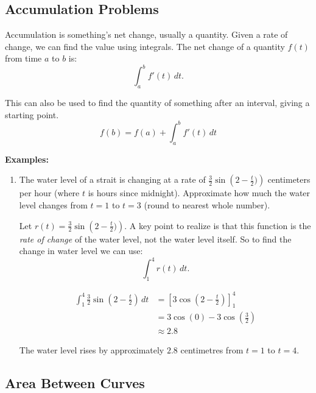 \documentclass[12pt]{article}
\begin{document}
\subsection{Accumulation Problems}
Accumulation is something's net change, usually a quantity. Given a rate of change, we can find the value using integrals. The net change of a quantity $f(t)$ from time $a$ to $b$ is:
\[ \int_{a}^{b} f'(t) \, dt. \]

This can also be used to find the quantity of something after an interval, giving a starting point.
\[ f(b) = f(a) + \int_{a}^{b} f'(t) \, dt \]

\noindent \textbf{Examples:}
\begin{enumerate}
    \item The water level of a strait is changing at a rate of $\frac{3}{2} \sin \left(2- \frac{t}{2}) \right)$ centimeters per hour (where $t$ is hours since midnight). Approximate how much the water level changes from $t=1$ to $t=3$ (round to nearest whole number).

          Let $r(t) = \frac{3}{2} \sin \left(2- \frac{t}{2}) \right)$. A key point to realize is that this function is the \textit{rate of change} of the water level, not the water level itself. So to find the change in water level we can use:
          \[ \int_{1}^{4} r(t) \, dt. \]

          \begin{align*}
              \int_{1}^{4} \frac{3}{2} \sin \left(2- \frac{t}{2} \right) \, dt & = \left[ 3 \cos \left(2 - \frac{t}{2} \right) \right]_1^4 \\[6pt]
                                                                               & = 3 \cos(0) - 3\cos \left( \frac{3}{2} \right)            \\[6pt]
                                                                               & \approx 2.8
          \end{align*}

          The water level rises by approximately $2.8$ centimetres from $t=1$ to $t=4$.
\end{enumerate} %

\subsection{Area Between Curves}
\end{document}
